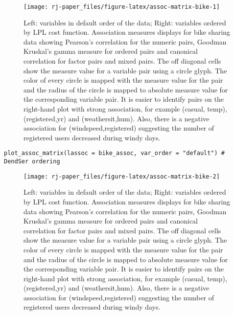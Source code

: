 \begin{figure}

{\centering \texttt{[image: rj-paper\_files/figure-latex/assoc-matrix-bike-1]} 

}

\caption{Left: variables in default order of the data; Right: variables ordered by LPL cost function. Association measures displays for bike sharing data showing Pearson's correlation for the numeric pairs, Goodman Kruskal's gamma measure for ordered pairs and canonical correlation for factor pairs and mixed pairs. The off diagonal cells show the measure value for a variable pair using a circle glyph. The color of every circle is mapped with the measure value for the pair and the radius of the circle is mapped to absolute measure value for the corresponding variable pair. It is easier to identify pairs on the right-hand plot with strong association, for example (casual, temp), (registered,yr) and (weathersit,hum). Also, there is a negative association for (windspeed,registered) suggesting the number of registered users decreased during windy days.}\label{fig:assoc-matrix-bike-1}
\end{figure}

\begin{verbatim}
plot_assoc_matrix(lassoc = bike_assoc, var_order = "default") # DendSer ordering
\end{verbatim}

\begin{figure}

{\centering \texttt{[image: rj-paper\_files/figure-latex/assoc-matrix-bike-2]} 

}

\caption{Left: variables in default order of the data; Right: variables ordered by LPL cost function. Association measures displays for bike sharing data showing Pearson's correlation for the numeric pairs, Goodman Kruskal's gamma measure for ordered pairs and canonical correlation for factor pairs and mixed pairs. The off diagonal cells show the measure value for a variable pair using a circle glyph. The color of every circle is mapped with the measure value for the pair and the radius of the circle is mapped to absolute measure value for the corresponding variable pair. It is easier to identify pairs on the right-hand plot with strong association, for example (casual, temp), (registered,yr) and (weathersit,hum). Also, there is a negative association for (windspeed,registered) suggesting the number of registered users decreased during windy days.}\label{fig:assoc-matrix-bike-2}
\end{figure}

